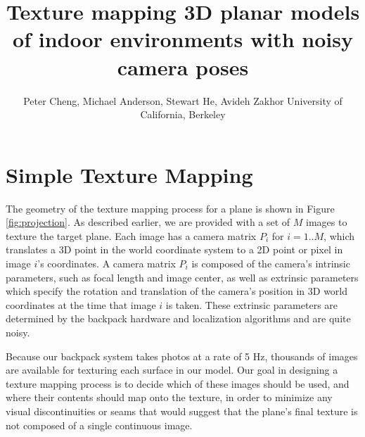 \documentclass[]{spie}  %
\title{Texture mapping 3D planar models of indoor environments with noisy camera poses}
\author{Peter Cheng, Michael Anderson, Stewart He, Avideh Zakhor
\skiplinehalf
University of California, Berkeley\\
}
\begin{document}
\section{Simple Texture Mapping}
\label{sec:simpleTextureMapping}

The geometry of the texture mapping process for a plane is shown in
Figure \ref{fig:projection}.  As described earlier, we are provided
with a set of $M$ images to texture the target plane. Each image has a
camera matrix $P_i$ for $i=1..M$, which translates a 3D point in the
world coordinate system to a 2D point or pixel in image $i$'s
coordinates. A camera matrix $P_i$ is composed of the camera's
intrinsic parameters, such as focal length and image center, as well
as extrinsic parameters which specify the rotation and translation of
the camera's position in 3D world coordinates at the time that image
$i$ is taken. These extrinsic parameters are determined by the
backpack hardware and localization algorithms \cite{chen2010indoor,
  liu2010indoor, kua2012loopclosure} and are quite noisy.

Because our backpack system takes photos at a rate of 5 Hz, thousands
of images are available for texturing each surface in our model. Our
goal in designing a texture mapping process is to decide which of
these images should be used, and where their contents should map onto
the texture, in order to minimize any visual discontinuities or seams
that would suggest that the plane's final texture is not composed of a
single continuous image.
\end{document}

